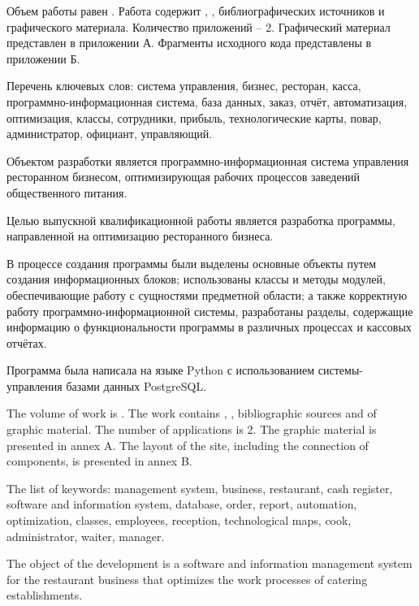 
Объем работы равен . Работа содержит , ,  библиографических источников и  графического материала. Количество приложений – 2. Графический материал представлен в приложении А. Фрагменты исходного кода представлены в приложении Б.

Перечень ключевых слов: система управления, бизнес, ресторан, касса, программно-информационная система, база данных, заказ, отчёт, автоматизация, оптимизация, классы, сотрудники, прибыль, технологические карты, повар, администратор, официант, управляющий.

Объектом разработки является программно-информационная система управления ресторанном бизнесом, оптимизирующая рабочих процессов заведений общественного питания.

Целью выпускной квалификационной работы является разработка программы, направленной на оптимизацию ресторанного бизнеса.

В процессе создания программы были выделены основные объекты путем создания информационных блоков; использованы классы и методы модулей, обеспечивающие работу с сущностями предметной области; а также корректную работу программно-информационной системы, разработаны разделы, содержащие информацию о функциональности программы в различных процессах и кассовых отчётах.

Программа была написала на языке Python с использованием системы-управления базами данных PostgreSQL.

  
The volume of work is . The work contains , ,  bibliographic sources and  of graphic material. The number of applications is 2. The graphic material is presented in annex A. The layout of the site, including the connection of components, is presented in annex B.

The list of keywords: management system, business, restaurant, cash register, software and information system, database, order, report, automation, optimization, classes, employees, reception, technological maps, cook, administrator, waiter, manager.

The object of the development is a software and information management system for the restaurant business that optimizes the work processes of catering establishments.

